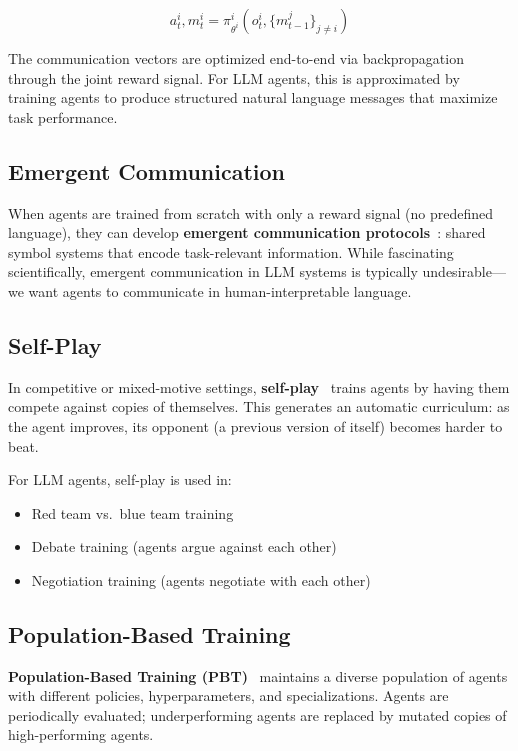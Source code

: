 \begin{equation}
  a^i_t, m^i_t = \pi^i_{\theta^i}(o^i_t, \{m^j_{t-1}\}_{j \neq i})
\end{equation}

The communication vectors are optimized end-to-end via backpropagation through the joint reward signal. For LLM agents, this is approximated by training agents to produce structured natural language messages that maximize task performance.

\subsection{Emergent Communication}
\label{emergent-communication}

When agents are trained from scratch with only a reward signal (no predefined language), they can develop \textbf{emergent communication protocols}~\cite{lazaridou2020emergent}: shared symbol systems that encode task-relevant information. While fascinating scientifically, emergent communication in LLM systems is typically undesirable---we want agents to communicate in human-interpretable language.

\subsection{Self-Play}
\label{self-play}

In competitive or mixed-motive settings, \textbf{self-play}~\cite{silver2017mastering} trains agents by having them compete against copies of themselves. This generates an automatic curriculum: as the agent improves, its opponent (a previous version of itself) becomes harder to beat.

For LLM agents, self-play is used in:

\begin{itemize}
  \item Red team vs.~blue team training
  \item Debate training (agents argue against each other)
  \item Negotiation training (agents negotiate with each other)
\end{itemize}

\subsection{Population-Based Training}
\label{population-based-training}

\textbf{Population-Based Training (PBT)}~\cite{jaderberg2019human} maintains a diverse population of agents with different policies, hyperparameters, and specializations. Agents are periodically evaluated; underperforming agents are replaced by mutated copies of high-performing agents.

